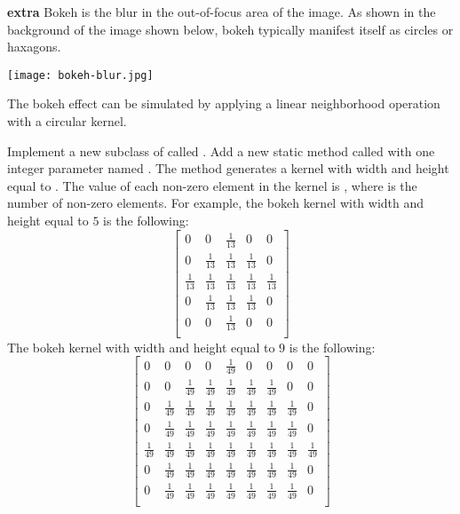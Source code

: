 \documentclass{book}
\begin{document}
\begin{exercise}\textbf{extra}
Bokeh is the blur in the out-of-focus area of the image. As shown in the background of the image shown below, bokeh typically manifest itself as circles or haxagons.
\begin{center}
\texttt{[image: bokeh-blur.jpg]}
\end{center}
The bokeh effect can be simulated by applying a linear neighborhood operation with a circular kernel.

Implement a new subclass of  called . Add a new static method called  with one integer parameter named . The method generates a kernel with width and height equal to . The value of each non-zero element in the kernel is , where  is the number of non-zero elements. For example, the bokeh kernel with width and height equal to $5$ is the following:
  $$
 \begin{bmatrix}
0 & 0 & \frac{1}{13} & 0 & 0\\
0 & \frac{1}{13} & \frac{1}{13} & \frac{1}{13} & 0\\
\frac{1}{13} & \frac{1}{13} & \frac{1}{13} & \frac{1}{13} & \frac{1}{13}\\
0 & \frac{1}{13} & \frac{1}{13} & \frac{1}{13} & 0 \\
0 & 0 & \frac{1}{13} & 0 & 0 \\
 \end{bmatrix}
$$
The bokeh kernel with width and height equal to $9$ is the following:
$$
 \begin{bmatrix}
0 & 0 & 0 & 0 & \frac{1}{49} & 0 & 0 & 0 & 0\\
0 & 0 & \frac{1}{49} & \frac{1}{49} & \frac{1}{49} & \frac{1}{49} & \frac{1}{49} & 0 & 0\\
0 & \frac{1}{49} & \frac{1}{49} & \frac{1}{49} & \frac{1}{49} & \frac{1}{49} & \frac{1}{49} & \frac{1}{49} & 0\\
0 & \frac{1}{49} & \frac{1}{49} & \frac{1}{49} & \frac{1}{49} & \frac{1}{49} & \frac{1}{49} & \frac{1}{49} & 0\\
\frac{1}{49} & \frac{1}{49} & \frac{1}{49} & \frac{1}{49} & \frac{1}{49} & \frac{1}{49} & \frac{1}{49} & \frac{1}{49} & \frac{1}{49}\\
0 & \frac{1}{49} & \frac{1}{49} & \frac{1}{49} & \frac{1}{49} & \frac{1}{49} & \frac{1}{49} & \frac{1}{49} & 0\\
0 & \frac{1}{49} & \frac{1}{49} & \frac{1}{49} & \frac{1}{49} & \frac{1}{49} & \frac{1}{49} & \frac{1}{49} & 0\\

\end{bmatrix}$$
\end{exercise}
\end{document}
